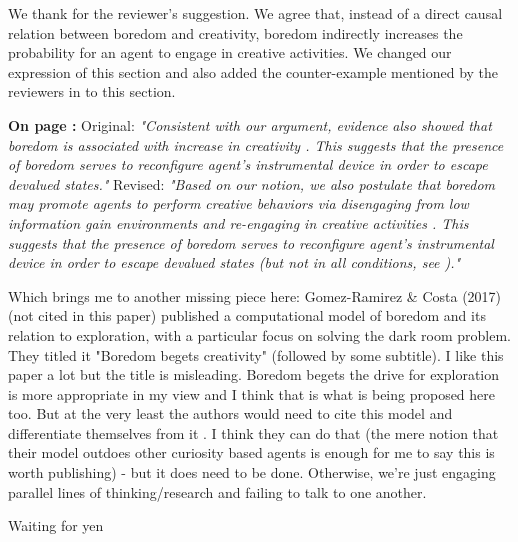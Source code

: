 \documentclass[utf8]{article}
\newenvironment{reply}  
    {\color{Blue}\noindent\newline}
    {\newline}
\newcommand{\revise}[3]{
    \noindent
    \newline
    \textbf{On page {#1}:}\newline
    \newline
    Original:\newline
    \textit{"#2"}
    \newline
    \newline
    Revised:\newline
    \textit{"#3"}\newline}
\begin{document}
        \begin{reply}
            We thank for the reviewer's suggestion. We agree that, instead of a direct causal relation between boredom and creativity, boredom indirectly increases the probability for an agent to engage in creative activities. We changed our expression of this section and also added the counter-example \citep{larson1990emotions} mentioned by the reviewers in to this section.
            
            \revise{\pageref{rev:creativity}}
                {Consistent with our argument, evidence also showed that boredom is associated with increase in creativity \citep{harris2000correlates, schubert1977boredom, schubert1978creativity}. This suggests that the presence of boredom serves to reconfigure agent's instrumental device in order to escape devalued states.}
                {Based on our notion, we also postulate that boredom may promote agents to perform creative behaviors via disengaging from low information gain environments and re-engaging in creative activities \citep{harris2000correlates, schubert1977boredom, schubert1978creativity}. This suggests that the presence of boredom serves to reconfigure agent's instrumental device in order to escape devalued states (but not in all conditions, see \cite{larson1990emotions}).}
        

        \end{reply}
        
        
        
        Which brings me to another missing piece here: Gomez-Ramirez \& Costa  (2017) (not cited in this paper) published a computational model of boredom and its relation to exploration, with a particular focus on solving the dark room problem. They titled it "Boredom begets creativity" (followed by some subtitle). I like this paper a lot but the title is misleading. Boredom begets the drive for exploration is more appropriate in my view and I think that is what is being proposed here too. But at the very least the authors would need to cite this model and differentiate themselves from it . I think they can do that (the mere notion that their model outdoes other curiosity based agents is enough for me to say this is worth publishing) - but it does need to be done. Otherwise, we're just engaging parallel lines of thinking/research and failing to talk to one another. 
        
        \begin{reply}
            Waiting for yen
        \end{reply}
        
\end{document}

